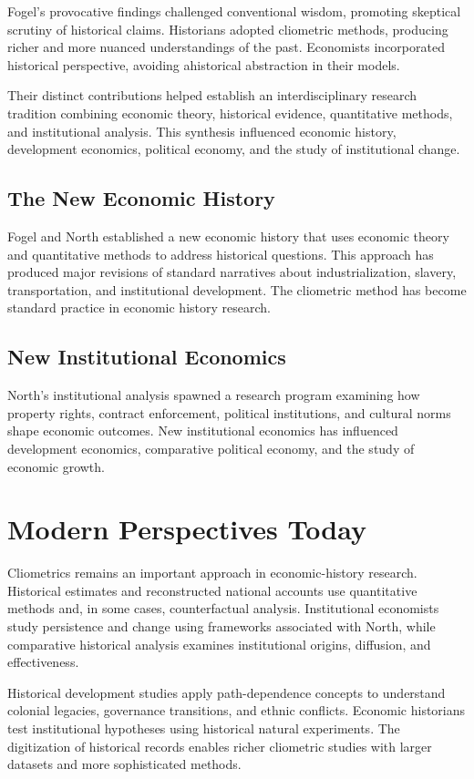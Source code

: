 Fogel's provocative findings challenged conventional wisdom, promoting skeptical
scrutiny of historical claims. Historians adopted cliometric methods, producing
richer and more nuanced understandings of the past. Economists incorporated
historical perspective, avoiding ahistorical abstraction in their models.

Their distinct contributions helped establish an interdisciplinary research
tradition combining economic theory, historical evidence, quantitative methods,
and institutional analysis. This synthesis influenced economic history,
development economics, political economy, and the study of institutional change.

\subsection*{The New Economic History}
Fogel and North established a new economic history that uses economic theory and
quantitative methods to address historical questions. This approach has produced
major revisions of standard narratives about industrialization, slavery,
transportation, and institutional development. The cliometric method has become
standard practice in economic history research.

\subsection*{New Institutional Economics}
North's institutional analysis spawned a research program examining how property
rights, contract enforcement, political institutions, and cultural norms shape
economic outcomes. New institutional economics has influenced development
economics, comparative political economy, and the study of economic growth.

\section{Modern Perspectives Today}
Cliometrics remains an important approach in economic-history research.
Historical estimates and reconstructed national accounts use quantitative
methods and, in some cases, counterfactual analysis. Institutional economists
study persistence and change using frameworks associated with North, while
comparative historical analysis examines institutional origins, diffusion, and
effectiveness.

Historical development studies apply path-dependence concepts to understand
colonial legacies, governance transitions, and ethnic conflicts. Economic
historians test institutional hypotheses using historical natural experiments.
The digitization of historical records enables richer cliometric studies with
larger datasets and more sophisticated methods.

